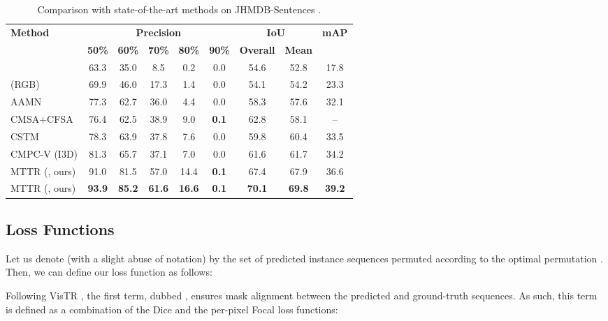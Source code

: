 \documentclass[10pt,twocolumn,letterpaper]{article}
\renewcommand{\cite}[1]{\citep{#1}}
\newcommand{\methodname}{MTTR}
\begin{document}
\begin{table*}
	\centering
    \setlength\extrarowheight{0.5pt}
\begin{tabular}{@{\extracolsep{4pt}}l ccccc c cc@{}} 
\toprule	 	
	\multirow{2}{*}{\textbf{Method}} &\multicolumn{5}{c}{\textbf{Precision}} &\multicolumn{2}{c}{\textbf{IoU}} & \multirow{2}{*}{\textbf{mAP}}  \\ \cline{2-6}\cline{7-8}
    & \textbf{50\%} & \textbf{60\%} & \textbf{70\%} & \textbf{80\%} & \textbf{90\%}   & \textbf{Overall}   & \textbf{Mean}  & \\
\midrule	
\citet{hu2016segmentation} &63.3 &35.0 &8.5 &0.2 &0.0 &54.6& 52.8& 17.8\\
\citet{gavrilyuk2018a2d} (RGB)  &69.9 & 46.0 & 17.3& 1.4 &0.0&54.1 &54.2 & 23.3 \\
AAMN \cite{yang2020aamn}  &77.3 & 62.7& 36.0& 4.4 & 0.0 &58.3 & 57.6 & 32.1 \\
CMSA+CFSA \cite{ye2021cfsa}  &76.4 &62.5 &38.9 &9.0&\textbf{0.1}&62.8 &58.1 & --\\
CSTM \cite{hui2021cstm}  &78.3 & 63.9 & 37.8 & 7.6 & 0.0 &59.8 & 60.4 & 33.5  \\
CMPC-V (I3D)  \cite{liu2021cmpc} &81.3 & 65.7& 37.1 &7.0 &0.0&61.6 &61.7& 34.2\\
\midrule
\methodname{} (, ours) &91.0&81.5&57.0&14.4&\textbf{0.1}&67.4&67.9&36.6\\
\methodname{} (, ours) &\textbf{93.9}&\textbf{85.2}&\textbf{61.6}&\textbf{16.6}&\textbf{0.1}&\textbf{70.1}&\textbf{69.8}&\textbf{39.2}\\
		\bottomrule
	\end{tabular}
\vspace{-0.2cm}
	\caption{ Comparison with state-of-the-art methods on JHMDB-Sentences  \cite{gavrilyuk2018a2d}.
		}
	\label{tbl:jhmdbs}
	\vspace{-0.6cm}
\end{table*}

\subsection{Loss Functions} \label{subsec:loss_fns}
Let us denote (with a slight abuse of notation) by  the set of predicted instance sequences permuted according to the optimal permutation . Then, we can define our loss function as follows:

Following VisTR \cite{wang2021vistr}, the first term, dubbed , ensures mask alignment between the predicted and ground-truth sequences. As such, this term is defined as a combination of the Dice \cite{milletari2016vnet} and the per-pixel Focal \cite{lin2017focal} loss functions:
 
\end{document}
